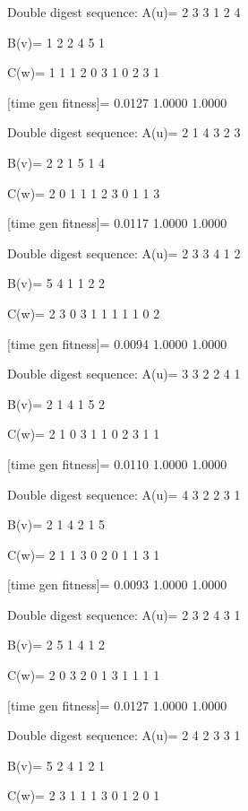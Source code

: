 Double digest sequence:
A(u)=
     2     3     3     1     2     4

B(v)=
     1     2     2     4     5     1

C(w)=
     1     1     1     2     0     3     1     0     2     3     1

[time gen fitness]=
    0.0127    1.0000    1.0000

Double digest sequence:
A(u)=
     2     1     4     3     2     3

B(v)=
     2     2     1     5     1     4

C(w)=
     2     0     1     1     1     2     3     0     1     1     3

[time gen fitness]=
    0.0117    1.0000    1.0000

Double digest sequence:
A(u)=
     2     3     3     4     1     2

B(v)=
     5     4     1     1     2     2

C(w)=
     2     3     0     3     1     1     1     1     1     0     2

[time gen fitness]=
    0.0094    1.0000    1.0000

Double digest sequence:
A(u)=
     3     3     2     2     4     1

B(v)=
     2     1     4     1     5     2

C(w)=
     2     1     0     3     1     1     0     2     3     1     1

[time gen fitness]=
    0.0110    1.0000    1.0000

Double digest sequence:
A(u)=
     4     3     2     2     3     1

B(v)=
     2     1     4     2     1     5

C(w)=
     2     1     1     3     0     2     0     1     1     3     1

[time gen fitness]=
    0.0093    1.0000    1.0000

Double digest sequence:
A(u)=
     2     3     2     4     3     1

B(v)=
     2     5     1     4     1     2

C(w)=
     2     0     3     2     0     1     3     1     1     1     1

[time gen fitness]=
    0.0127    1.0000    1.0000

Double digest sequence:
A(u)=
     2     4     2     3     3     1

B(v)=
     5     2     4     1     2     1

C(w)=
     2     3     1     1     1     3     0     1     2     0     1

